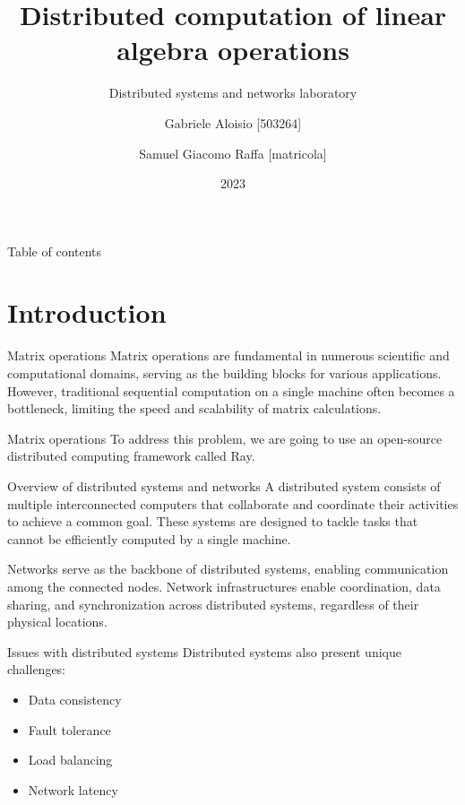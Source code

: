 \documentclass{beamer}
\title{Distributed computation of linear algebra operations}
\subtitle{Distributed systems and networks laboratory}
\author{
    Gabriele Aloisio [503264] \and
    Samuel Giacomo Raffa [matricola]
    }
\institute{Università degli studi di Messina}
\date{2023}
\begin{document}
\maketitle

\begin{frame}{Table of contents}
    \tableofcontents
\end{frame}

\section{Introduction}
\begin{frame}{Matrix operations}
    Matrix operations are fundamental in numerous scientific and computational domains, serving as the building blocks for various applications. However, traditional sequential computation on a single machine often becomes a bottleneck, limiting the speed and scalability of matrix calculations.
\end{frame}

\begin{frame}{Matrix operations}
    To address this problem, we are going to use an open-source distributed computing framework called \alert{Ray}.
\end{frame}

\begin{frame}{Overview of distributed systems and networks}
    A \alert{distributed system} consists of multiple interconnected computers that collaborate and coordinate their activities to achieve a common goal. These systems are designed to tackle  tasks that cannot be efficiently computed by a single machine.

    \alert{Networks} serve as the backbone of distributed systems, enabling communication among the connected nodes. Network infrastructures enable coordination, data sharing, and synchronization across distributed systems, regardless of their physical locations.
\end{frame}


\begin{frame}{Issues with distributed systems}
    Distributed systems also present unique challenges:
    \begin{itemize}
        \item{Data consistency}
        \item {Fault tolerance}
        \item {Load balancing}
        \item {Network latency}
    \end{itemize}
\end{frame}
\end{document}
